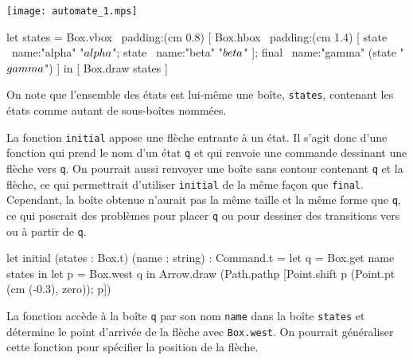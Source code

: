 \documentclass[twoside]{studia-Hermann}
\begin{document}
\begin{minipage}{0.2\linewidth}
  \texttt{[image: automate\_1.mps]}
\end{minipage}
\begin{minipage}{0.7\linewidth}
\begin{ocaml}
let states = Box.vbox ~padding:(cm 0.8)
  [ Box.hbox ~padding:(cm 1.4)
      [ state ~name:"alpha" "$\\alpha$";
        state ~name:"beta" "$\\beta$" ];
    final ~name:"gamma" (state "$\\gamma$") ] in
[ Box.draw states ]
\end{ocaml}
\end{minipage}

\medskip\noindent On note que l'ensemble des états est lui-même une boîte,
\texttt{states}, contenant les états comme autant de sous-boîtes nommées.

La  fonction \texttt{initial} appose une  flèche entrante  à un
état.  Il  s'agit donc  d'une fonction  qui prend le nom d'un état
\texttt{q}  et qui 
renvoie une commande dessinant une  flèche vers \texttt{q}. On pourrait aussi
renvoyer une  boîte sans  contour contenant \texttt{q}  et la flèche,  ce qui
permettrait   d'utiliser  \texttt{initial}  de   la  même   façon  que
\texttt{final}.   Cependant, la  boîte  obtenue n'aurait  pas la  même
taille et  la même forme que  \texttt{q}, ce qui poserait  des problèmes pour
placer \texttt{q} ou pour dessiner des transitions vers ou à partir de
\texttt{q}. 
\begin{ocaml}
let initial (states : Box.t) (name : string) : Command.t =
  let q = Box.get name states in
  let p = Box.west q in
  Arrow.draw (Path.pathp [Point.shift p (Point.pt (cm (-0.3), zero)); p])
\end{ocaml}
La fonction  accède à  la boîte \texttt{q}  par son  nom \texttt{name}
dans la  boîte \texttt{states} et détermine le point d'arrivée de la
flèche avec \texttt{Box.west}. On pourrait généraliser cette fonction
pour spécifier la position de la flèche.
\end{document}
